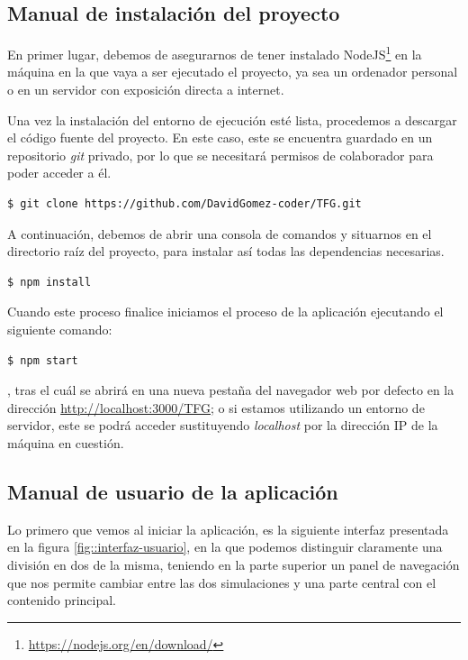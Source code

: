 \documentclass[../main.tex]{subfiles}
\begin{document}
\subsection{Manual de instalación del proyecto}
En primer lugar, debemos de asegurarnos de tener instalado NodeJS\footnote{\url{ https://nodejs.org/en/download/}} en la máquina en la que vaya a ser ejecutado el proyecto, ya sea un ordenador personal o en un servidor con exposición directa a internet.

Una vez la instalación del entorno de ejecución esté lista, procedemos a descargar el código fuente del proyecto. En este caso, este se encuentra guardado en un repositorio \textit{git} privado, por lo que se necesitará permisos de colaborador para poder acceder a él. 

\begin{lstlisting}[language=bash]
  $ git clone https://github.com/DavidGomez-coder/TFG.git
\end{lstlisting}

A continuación, debemos de abrir una consola de comandos y situarnos en el directorio raíz del proyecto, para instalar así todas las dependencias necesarias. 

\begin{lstlisting}[language=bash]
  $ npm install
\end{lstlisting}

Cuando este proceso finalice iniciamos el proceso de la aplicación ejecutando el siguiente comando:

\begin{lstlisting}[language=bash]
  $ npm start
\end{lstlisting}

, tras el cuál se abrirá en una nueva pestaña del navegador web por defecto en la dirección \url{http://localhost:3000/TFG}; o si estamos utilizando un entorno de servidor, este se podrá acceder sustituyendo \textit{localhost} por la dirección IP de la máquina en cuestión.



\subsection{Manual de usuario de la aplicación}
Lo primero que vemos al iniciar la aplicación, es la siguiente interfaz presentada en la figura \ref{fig::interfaz-usuario}, en la que podemos distinguir claramente una división en dos de la misma, teniendo en la parte superior un panel de navegación que nos permite cambiar entre las dos simulaciones y una parte central con el contenido principal. \\
\end{document}
